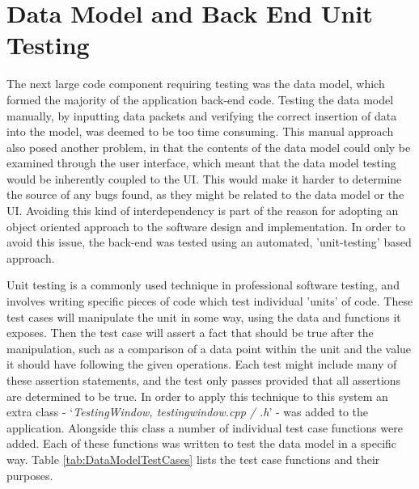 
\section{Data Model and Back End Unit Testing} \label{BackEndUnitTesting}
The next large code component requiring testing was the data model, which formed the majority of the application back-end code. Testing the data model manually, by inputting data packets and verifying the correct insertion of data into the model, was deemed to be too time consuming. This manual approach also posed another problem, in that the contents of the data model could only be examined through the user interface, which meant that the data model testing would be inherently coupled to the UI. This would make it harder to determine the source of any bugs found, as they might be related to the data model or the UI. Avoiding this kind of interdependency is part of the reason for adopting an object oriented approach to the software design and implementation. In order to avoid this issue, the back-end was tested using an automated, 'unit-testing' based approach.

Unit testing is a commonly used technique in professional software testing, and involves writing specific pieces of code which test individual 'units' of code. These test cases will manipulate the unit in some way, using the data and functions it exposes. Then the test case will assert a fact that should be true after the manipulation, such as a comparison of a data point within the unit and the value it should have following the given operations. Each test might include many of these assertion statements, and the test only passes provided that all assertions are determined to be true. In order to apply this technique to this system an extra class - `\textit{TestingWindow, testingwindow.cpp / .h}' - was added to the application. Alongside this class a number of individual test case functions were added. Each of these functions was written to test the data model in a specific way. Table \ref{tab:DataModelTestCases} lists the test case functions and their purposes.

